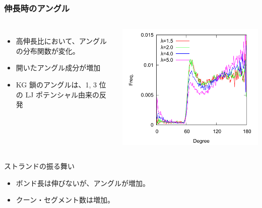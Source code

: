 \documentclass[11pt, dvipdfmx]{beamer}
\begin{document}
\begin{frame}
\frametitle{伸長時のアングル}

\begin{columns}[totalwidth=1\textwidth]

\begin{itemize}
\item
高伸長比において、アングルの分布関数が変化。
\item
開いたアングル成分が増加
\item
KG 鎖のアングルは、1, 3 位の LJ ポテンシャル由来の反発

\end{itemize}

\centering
\includegraphics[width=\columnwidth]{./fig/Angle_Step.pdf}

\end{columns}

\begin{exampleblock}{ストランドの振る舞い}
\begin{itemize}
\item
ボンド長は伸びないが、アングルが増加。
\item
クーン・セグメント数は増加。
\end{itemize}
\end{exampleblock}


\end{frame}
\end{document}

